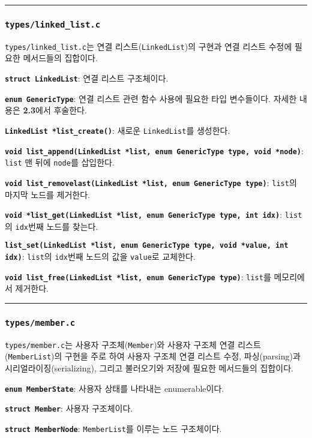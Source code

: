 \documentclass[runningheads]{llncs}
\begin{document}
\noindent\rule{2cm}{0.4pt}

\subsubsection{\texttt{types/linked_list.c}}
\texttt{types/linked_list.c}는 연결 리스트(\texttt{LinkedList})\cite{linkedlist}의 구현과 연결 리스트 수정에 필요한 메서드들의 집합이다.

\textbf{\texttt{struct LinkedList}}: 연결 리스트 구조체이다.

\textbf{\texttt{enum GenericType}}: 연결 리스트 관련 함수 사용에 필요한 타입 변수들이다. 자세한 내용은 \textbf{2.3}에서 후술한다.

\textbf{\texttt{LinkedList *list_create()}}: 새로운 \texttt{LinkedList}를 생성한다.

\textbf{\texttt{void list_append(LinkedList *list, enum GenericType type, void *node)}}: \texttt{list} 맨 뒤에 \texttt{node}를 삽입한다.

\textbf{\texttt{void list_removelast(LinkedList *list, enum GenericType type)}}: \texttt{list}의 마지막 노드를 제거한다.

\textbf{\texttt{void *list_get(LinkedList *list, enum GenericType type, int idx)}}: \texttt{list}의 \texttt{idx}번째 노드를 찾는다.

\textbf{\texttt{list_set(LinkedList *list, enum GenericType type, void *value, int idx)}}: \texttt{list}의 \texttt{idx}번째 노드의 값을 \texttt{value}로 교체한다.

\textbf{\texttt{void list_free(LinkedList *list, enum GenericType type)}}: \texttt{list}를 메모리에서 제거한다.

\noindent\rule{2cm}{0.4pt}

\subsubsection{\texttt{types/member.c}}
\texttt{types/member.c}는 사용자 구조체(\texttt{Member})와 사용자 구조체 연결 리스트(\texttt{MemberList})의 구현을 주로 하여 사용자 구조체 연결 리스트 수정, 파싱(parsing)과 시리얼라이징(serializing), 그리고 불러오기와 저장에 필요한 메서드들의 집합이다.

\textbf{\texttt{enum MemberState}}: 사용자 상태를 나타내는 enumerable이다.

\textbf{\texttt{struct Member}}: 사용자 구조체이다.

\textbf{\texttt{struct MemberNode}}: \texttt{MemberList}를 이루는 노드 구조체이다.
\end{document}
